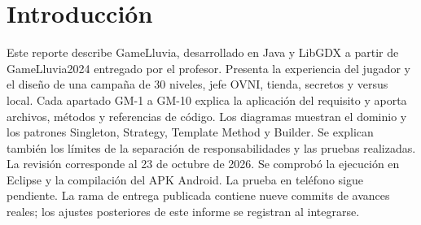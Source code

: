 \section*{Introducción}
Este reporte describe GameLluvia, desarrollado en Java y LibGDX a partir de GameLluvia2024 entregado por el profesor. Presenta la experiencia del jugador y el diseño de una campaña de 30 niveles, jefe OVNI, tienda, secretos y versus local.
Cada apartado GM-1 a GM-10 explica la aplicación del requisito y aporta archivos, métodos y referencias de código. Los diagramas muestran el dominio y los patrones Singleton, Strategy, Template Method y Builder. Se explican también los límites de la separación de responsabilidades y las pruebas realizadas.
La revisión corresponde al 23 de octubre de 2026. Se comprobó la ejecución en Eclipse y la compilación del APK Android. La prueba en teléfono sigue pendiente. La rama de entrega publicada contiene nueve commits de avances reales; los ajustes posteriores de este informe se registran al integrarse.
